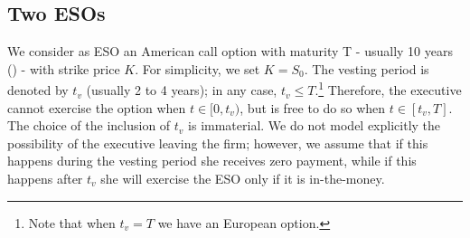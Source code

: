 \subsection{Two ESOs}
We consider as ESO an American call option with maturity T - usually 10 years (\cite{marquardt2002cost}) - with strike price $K$. For simplicity, we set $K=S_0$. The vesting period is denoted by $t_v$ (usually 2 to 4 years); in any case, $t_v \le T$.\footnote{Note that when $t_v = T$ we have an European option.} Therefore, the executive cannot exercise the option when $t \in [0, t_v)$, but is free to do so when $t \in [t_v, T]$. The choice of the inclusion of $t_v$ is immaterial. We do not model explicitly the possibility of the executive leaving the firm; however, we assume that if this happens during the vesting period she receives zero payment, while if this happens after $t_v$ she will exercise the ESO only if it is in-the-money. %

